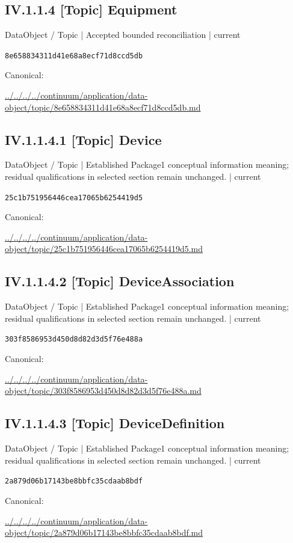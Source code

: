 \documentclass[10pt,a4paper]{article}
\begin{document}
\subsection*{IV.1.1.4 [Topic] Equipment}
\label{element-8e658834311d41e68a8ecf71d8ccd5db}
{\small DataObject / Topic | Accepted bounded reconciliation | current}\par
\texttt{8e658834311d41e68a8ecf71d8ccd5db}\par
Canonical: \par
{\footnotesize\url{../../../../continuum/application/data-object/topic/8e658834311d41e68a8ecf71d8ccd5db.md}}\par
\subsection*{IV.1.1.4.1 [Topic] Device}
\label{element-25c1b751956446cea17065b6254419d5}
{\small DataObject / Topic | Established Package1 conceptual information meaning; residual qualifications in selected section remain unchanged. | current}\par
\texttt{25c1b751956446cea17065b6254419d5}\par
Canonical: \par
{\footnotesize\url{../../../../continuum/application/data-object/topic/25c1b751956446cea17065b6254419d5.md}}\par
\subsection*{IV.1.1.4.2 [Topic] DeviceAssociation}
\label{element-303f8586953d450d8d82d3d5f76e488a}
{\small DataObject / Topic | Established Package1 conceptual information meaning; residual qualifications in selected section remain unchanged. | current}\par
\texttt{303f8586953d450d8d82d3d5f76e488a}\par
Canonical: \par
{\footnotesize\url{../../../../continuum/application/data-object/topic/303f8586953d450d8d82d3d5f76e488a.md}}\par
\subsection*{IV.1.1.4.3 [Topic] DeviceDefinition}
\label{element-2a879d06b17143be8bbfc35cdaab8bdf}
{\small DataObject / Topic | Established Package1 conceptual information meaning; residual qualifications in selected section remain unchanged. | current}\par
\texttt{2a879d06b17143be8bbfc35cdaab8bdf}\par
Canonical: \par
{\footnotesize\url{../../../../continuum/application/data-object/topic/2a879d06b17143be8bbfc35cdaab8bdf.md}}\par
\end{document}
